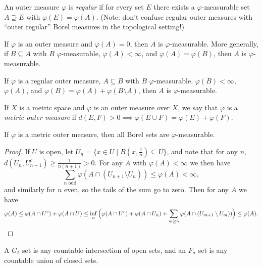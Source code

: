 \documentclass[letterpaper,11pt]{report}
\begin{document}
\begin{defn} An outer measure $\varphi$ is \emph{regular} if for every set $E$ there exists a $\varphi$-measurable set $A \supseteq E$ with $\varphi(E) = \varphi(A)$. (Note: don't confuse regular outer measures with ``outer regular'' Borel measures in the topological setting!)
\end{defn}

\begin{prop} If $\varphi$ is an outer measure and $\varphi(A) = 0$, then $A$ is $\varphi$-measurable. More generally, if $B \subseteq A$ with $B$ $\varphi$-measurable, $\varphi(A) < \infty$, and $\varphi(A) = \varphi(B)$, then $A$ is $\varphi$-measurable.
\end{prop}

\begin{prop} If $\varphi$ is a regular outer measure, $A \subseteq B$ with $B$ $\varphi$-measurable, $\varphi(B) < \infty$, $\varphi(A)$, and $\varphi(B) = \varphi(A) + \varphi(B\setminus A)$, then $A$ is $\varphi$-measurable.
\end{prop}

\begin{defn} If $X$ is a metric space and $\varphi$ is an outer measure over $X$, we say that $\varphi$ is a \emph{metric outer measure} if $d(E,F) > 0 \implies \varphi(E \cup F) = \varphi(E) + \varphi(F)$.
\end{defn}

\begin{thm} If $\varphi$ is a metric outer measure, then all Borel sets are $\varphi$-measurable.
\end{thm}
\begin{proof} If $U$ is open, let $U_n = \{x \in U \mid B(x,\frac{1}{n}) \subseteq U\}$, and note that for any $n$, $d(U_n, U_{n+1}^c) \ge \frac{1}{n(n+1)} > 0$. For any $A$ with $\varphi(A) < \infty$ we then have
\[
\sum_{n\text{ odd}} \varphi(A \cap (U_{n+1}\setminus U_n)) \le \varphi(A) < \infty,
\]
and similarly for $n$ even, so the tails of the sum go to zero. Then for any $A$ we have
\[
\varphi(A) \le \varphi(A \cap U^c) + \varphi(A \cap U) \le \inf_n \Big(\varphi(A\cap U^c) + \varphi(A\cap U_n) + \sum_{m \ge n} \varphi(A\cap (U_{m+1}\setminus U_m))\Big) \le \varphi(A).\qedhere
\]
\end{proof}

\begin{defn} A $G_\delta$ set is any countable intersection of open sets, and an $F_\sigma$ set is any countable union of closed sets.
\end{defn}
\end{document}
